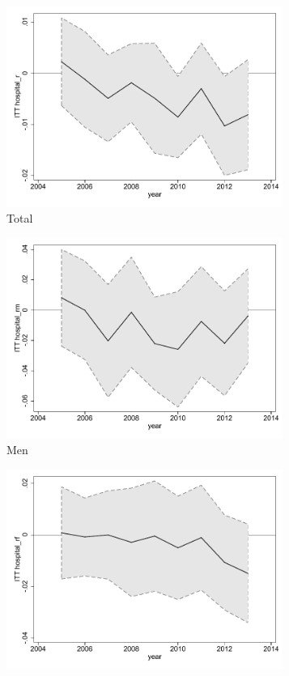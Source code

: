 \documentclass[a4paper ]{article}
\begin{document}
\begin{figure}[h!]
	\centering
	\begin{subfigure}[t]{0.31\textwidth}
		\centering
		\includegraphics[width=0.99\textwidth]{R1_LC_hospital_r}
		\caption{Total}		
	\end{subfigure}
	\begin{subfigure}[t]{0.31\textwidth}
		\centering
		\includegraphics[width=0.99\textwidth]{R1_LC_hospital_rm}
		\caption{Men}		
	\end{subfigure}
	\quad
	\begin{subfigure}[t]{0.31\textwidth}
		\centering
		\includegraphics[width=0.99\textwidth]{R1_LC_hospital_rf}

\end{subfigure}
\end{figure}
\end{document}
